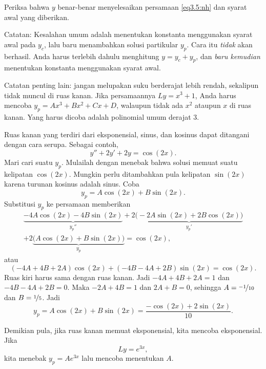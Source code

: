 \begin{exercise}
Periksa bahwa $y$ benar-benar menyelesaikan persamaan \eqref{eq3.5:nh} dan syarat awal yang diberikan.
\end{exercise}

Catatan: Kesalahan umum adalah menentukan konstanta menggunakan syarat awal pada $y_c$, lalu baru menambahkan solusi partikular $y_p$. Cara itu \emph{tidak} akan berhasil. Anda harus terlebih dahulu menghitung $y = y_c + y_p$, dan \emph{baru kemudian} menentukan konstanta menggunakan syarat awal.

Catatan penting lain: jangan melupakan suku berderajat lebih rendah, sekalipun tidak muncul di ruas kanan. Jika persamaannya $Ly=x^3+1$, Anda harus mencoba $y_p = Ax^3+Bx^2+Cx+D$, walaupun tidak ada $x^2$ ataupun $x$ di ruas kanan. Yang harus dicoba adalah polinomial umum derajat 3.

\medskip

Ruas kanan yang terdiri dari eksponensial, sinus, dan kosinus dapat ditangani dengan cara serupa. Sebagai contoh,
\begin{equation*}
y''+2y'+2y = \cos (2x) .
\end{equation*}
Mari cari suatu $y_p$. Mulailah dengan menebak bahwa solusi memuat suatu kelipatan $\cos(2x)$. Mungkin perlu ditambahkan pula kelipatan $\sin (2x)$ karena turunan kosinus adalah sinus. Coba
\begin{equation*}
y_p = A \cos (2x) + B \sin (2x) .
\end{equation*}
Substitusi $y_p$ ke persamaan memberikan
\begin{multline*}
\underbrace{-4 A \cos (2x) - 4 B \sin (2x)}_{y_p''}
+2 \underbrace{\bigl(-2A \sin (2x) + 2B \cos (2x)\bigr)}_{y_p'}
\\
+
2 \underbrace{\bigl(A \cos (2x) + B \sin (2x)\bigr)}_{y_p}
= \cos (2x) ,
\end{multline*}
atau
\begin{equation*}
(-4A+4B+2A) \cos(2x) +
(-4B-4A+2B) \sin(2x)
= \cos(2x) .
\end{equation*}
Ruas kiri harus sama dengan ruas kanan. Jadi $-4A + 4B + 2A = 1$ dan $-4B - 4A + 2B = 0$. Maka $-2A+4B =1$ dan $2A+B=0$, sehingga $A=\nicefrac{-1}{10}$ dan $B=\nicefrac{1}{5}$. Jadi
\begin{equation*}
y_p = A \cos (2x) + B \sin (2x) = \frac{-\cos (2x) + 2 \sin (2x)}{10} .
\end{equation*}

Demikian pula, jika ruas kanan memuat eksponensial, kita mencoba eksponensial. Jika
\begin{equation*}
Ly = e^{3x},
\end{equation*}
kita menebak $y_p = A e^{3x}$ lalu mencoba menentukan $A$.

